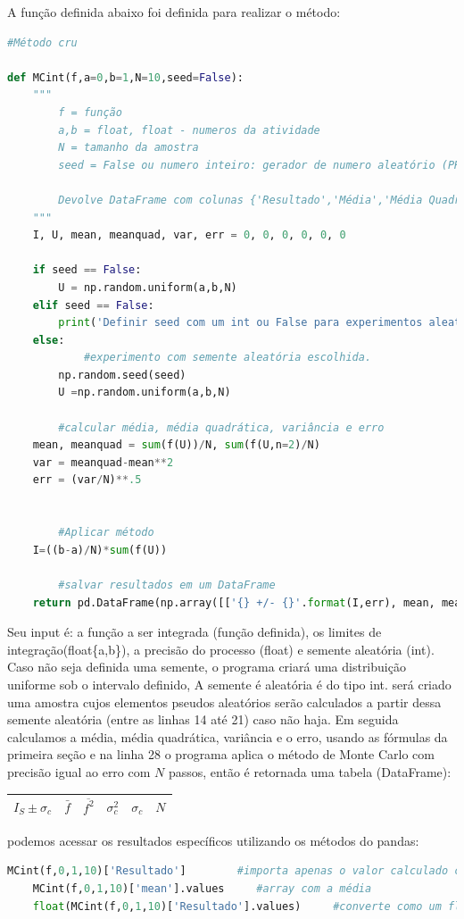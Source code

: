 \documentclass{article}
\begin{document}
A função definida abaixo foi definida para realizar o método:
\begin{lstlisting}[language=Python]
	#Método cru

def MCint(f,a=0,b=1,N=10,seed=False):
	"""
		f = função
		a,b = float, float - numeros da atividade
		N = tamanho da amostra
		seed = False ou numero inteiro: gerador de numero aleatório (PRNG).

		Devolve DataFrame com colunas {'Resultado','Média','Média Quadrática','Variância','Erro','Steps'}
	"""
	I, U, mean, meanquad, var, err = 0, 0, 0, 0, 0, 0

	if seed == False:
		U = np.random.uniform(a,b,N)
	elif seed == False:
		print('Definir seed com um int ou False para experimentos aleatórios.')
	else:
			#experimento com semente aleatória escolhida.
		np.random.seed(seed)
		U =np.random.uniform(a,b,N)

		#calcular média, média quadrática, variância e erro
	mean, meanquad = sum(f(U))/N, sum(f(U,n=2)/N)
	var = meanquad-mean**2
	err = (var/N)**.5


		#Aplicar método	
	I=((b-a)/N)*sum(f(U))

		#salvar resultados em um DataFrame
	return pd.DataFrame(np.array([['{} +/- {}'.format(I,err), mean, meanquad, var, err, int(N)]]),index=['Valores'],columns=['Resultado','Média','Média Quadrática','Variância','Erro','Passos'])

\end{lstlisting}

Seu input é: a função a ser integrada (função definida), os limites de integração(float\{a,b\}), a precisão do processo (float) e semente aleatória (int). Caso não seja definida uma semente, o programa criará uma distribuição uniforme sob o intervalo definido, A semente é aleatória é do tipo int. será criado uma amostra cujos elementos pseudos aleatórios serão calculados a partir dessa semente aleatória (entre as linhas 14 até 21) caso não haja. Em seguida calculamos a média, média quadrática, variância e o erro, usando as fórmulas da primeira seção e na linha 28 o programa aplica o método de Monte Carlo com precisão igual ao erro com $N$ passos, então é retornada uma tabela (DataFrame):
\begin{table}[h!]
    \centering
    \begin{tabular}{|c|c|c|c|c|c|}
    \hline
    $I_S\pm \sigma_c$ & $\bar{f}$&$\overline{f^2}$&$\sigma_c^2$&$\sigma_c$&$N$\\
    \hline
\end{tabular}
\end{table}
podemos acessar os resultados específicos utilizando os métodos do pandas:
\begin{lstlisting}[language=Python]
    MCint(f,0,1,10)['Resultado']        #importa apenas o valor calculado como um dataframe novo
    MCint(f,0,1,10)['mean'].values     #array com a média
    float(MCint(f,0,1,10)['Resultado'].values)     #converte como um float
\end{lstlisting}
\end{document}
